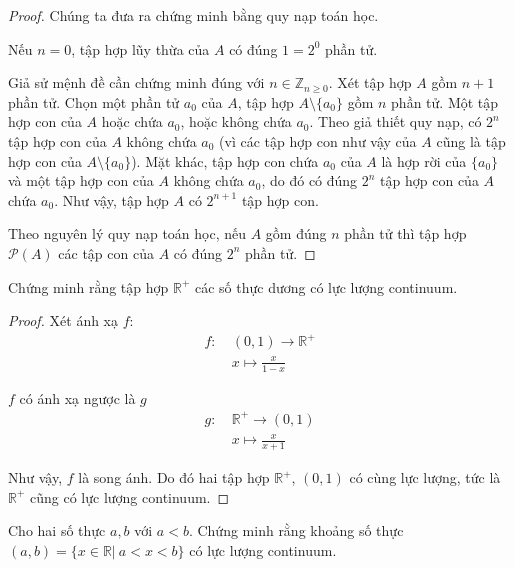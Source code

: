 \begin{proof}
    Chúng ta đưa ra chứng minh bằng quy nạp toán học.

    Nếu $n = 0$, tập hợp lũy thừa của $A$ có đúng $1 = 2^{0}$ phần tử.

    Giả sử mệnh đề cần chứng minh đúng với $n\in \mathbb{Z}_{n\geq 0}$. Xét tập hợp $A$ gồm $n + 1$ phần tử. Chọn một phần tử $a_{0}$ của $A$, tập hợp $A\setminus\{ 
a_{0} \}$ gồm $n$ phần tử. Một tập hợp con của $A$ hoặc chứa $a_{0}$, hoặc không chứa $a_{0}$. Theo giả thiết quy nạp, có $2^{n}$ tập hợp con của $A$ không chứa $a_{0}$ (vì các tập hợp con như vậy của $A$ cũng là tập hợp con của $A\setminus \{a_{0}\}$). Mặt khác, tập hợp con chứa $a_{0}$ của $A$ là hợp rời của $\{ a_{0} \}$ và một tập hợp con của $A$ không chứa $a_{0}$, do đó có đúng $2^{n}$ tập hợp con của $A$ chứa $a_{0}$. Như vậy, tập hợp $A$ có $2^{n+1}$ tập hợp con.

    Theo nguyên lý quy nạp toán học, nếu $A$ gồm đúng $n$ phần tử thì tập hợp $\mathcal{P}(A)$ các tập con của $A$ có đúng $2^{n}$ phần tử.
\end{proof}

\begin{exercise}Chứng minh rằng tập hợp $\mathbb{R}^{+}$ các số thực dương có lực lượng continuum.
\end{exercise}

\begin{proof}Xét ánh xạ $f$:
    \begin{align*}
        f:\  & (0, 1) \to \mathbb{R}^{+} \\
             & x\mapsto \frac{x}{1 - x}
    \end{align*}
    
    $f$ có ánh xạ ngược là $g$
    \begin{align*}
        g:\  & \mathbb{R}^{+} \to (0, 1) \\
             & x\mapsto \frac{x}{x + 1}
    \end{align*}
    
    Như vậy, $f$ là song ánh. Do đó hai tập hợp $\mathbb{R}^{+}$, $(0, 1)$ có cùng lực lượng, tức là $\mathbb{R}^{+}$ cũng có lực lượng continuum.
\end{proof}

\begin{exercise}Cho hai số thực $a, b$ với $a < b$. Chứng minh rằng khoảng số thực $(a, b) = \{ x\in \mathbb{R}|\ a < x < b \}$ có lực lượng continuum.
\end{exercise}

